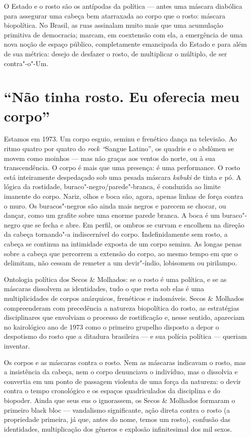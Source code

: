 O Estado e o rosto são os antípodas da política --- antes uma máscara
diabólica para assegurar uma cabeça bem atarraxada ao corpo que o rosto:
máscara biopolítica. No Brasil, as ruas assinalam muito mais que uma
acumulação primitiva de democracia; marcam, em coextensão com ela, a
emergência de uma nova noção de espaço público, completamente emancipada
do Estado e para além de sua métrica: desejo de desfazer o rosto, de
multiplicar o múltiplo, de ser contra"-o"-Um.

\section{``Não tinha rosto. Eu oferecia meu corpo''}

Estamos em 1973. Um corpo esguio, seminu e frenético dança na televisão.
Ao ritmo quatro por quatro do \emph{rock ``}Sangue Latino'', os quadris
e o abdômen se movem como moinhos --- mas não graças aos ventos do norte,
ou à sua transcendência. O corpo é mais que uma presença: é uma
performance. O rosto está inteiramente despedaçado sob uma pesada
máscara \emph{kabuki} de tinta e pó. A lógica da rostidade,
buraco"-negro/parede"-branca, é conduzida ao limite imanente do corpo.
Nariz, olhos e boca são, agora, apenas linhas de força contra o muro. Os
buracos"-negros são ainda mais negros e parecem se chocar, ou dançar,
como um grafite sobre uma enorme parede branca. A boca é um buraco"-negro
que se fecha e abre. Em perfil, os ombros se curvam e encolhem na
direção da cabeça tornando"-a indiscernível do corpo. Indefinidamente sem
rosto, a cabeça se continua na intimidade exposta de um corpo seminu. As
longas penas sobre a cabeça que percorrem a extensão do corpo, ao mesmo
tempo em que o delimitam, não cessam de remeter a um devir"-índio,
lobisomem ou pirilampo.

Ontologia política dos Secos \& Molhados: se o rosto é uma política, e
se as máscaras dissolvem as identidades, tudo o que resta sob elas é uma
multiplicidades de corpos anárquicos, frenéticos e indomáveis. Secos \&
Molhados compreenderam com precedência a natureza biopolítica do rosto,
as estratégias disciplinares que envolviam o processo de rostificação e,
nesse sentido, apareciam no kairológico ano de 1973 como o primeiro
grupelho disposto a depor o despotismo do rosto que a ditadura
brasileira --- e sua polícia política --- queriam inventar.

Os corpos e as máscaras contra o rosto. Nem as máscaras indicavam o
rosto, mas a insistência da cabeça, nem o corpo denunciava o indivíduo,
mas o dissolvia e convertia em um ponto de passagem violenta de uma
força da natureza: o devir contra o tempo cronológico e os espaços
quadriculados da disciplina e do biopoder. Ainda que seus eus o
ignorassem, os Secos \& Molhados formaram o primeiro black bloc ---
vandalismo significante, ação direta contra o rosto (a propriedade
primeira, já que, antes do nome, temos um rosto), confusão das
identidades, multiplicação dos gêneros e explosão infinitesimal dos mil
sexos.

